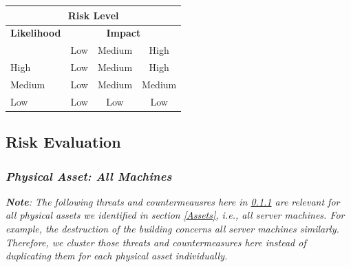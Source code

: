 \documentclass[english]{article}
\begin{document}
\vspace{5mm}

\begin{center}
\begin{tabular}{|l|c|c|c|}
\hline
\multicolumn{4}{|c|}{{\bf Risk Level}} \\
\hline
{{\bf Likelihood}} & \multicolumn{3}{c|}{{\bf Impact}} \\ %
     & Low & Medium & High \\  \hline
 High & Low & Medium & High  \\
\hline
 Medium & Low & Medium & Medium \\
\hline
 Low & Low & Low & Low \\
\hline
\end{tabular}
\end{center}

\subsection{Risk Evaluation}

\newcommand{\allmachinesNumber}{1}
\newcommand{\allmachinesconfidentialNumber}{2}
\newcommand{\firewallNumber}{3}
\newcommand{\webserverNumber}{4}
\newcommand{\adminserverNumber}{5}
\newcommand{\databaseNumber}{6}
\newcommand{\corecaNumber}{7}
\newcommand{\backupserverNumber}{8}
\newcommand{\softwareNumber}{9}
\newcommand{\informationNumber}{10}
\newcommand{\privatekeysNumber}{11}
\newcommand{\crlNumber}{12}
\newcommand{\sshprivatekeysNumber}{13}
\newcommand{\passwordsNumber}{14}
\newcommand{\systemadminsNumber}{15}
\newcommand{\caadminsNumber}{16}
\newcommand{\normalemployeeNumber}{17}
\newcommand{\trustofwhistleblowersNumber}{18}
\newcommand{\journalisticcredibilityNumber}{19}
\newcommand{\exclusivityNumber}{20}
\newcommand{\publicreachNumber}{21}

\subsubsection{{\it Physical Asset: \textbf{All Machines}}}
\label{All_Machines}

\textit{\textbf{Note}: The following threats and countermeausres here in \ref{All_Machines} are relevant for all physical assets we identified in section \ref{Assets}, i.e., all server machines. For example, the destruction of the building concerns all server machines similarly. Therefore, we cluster those threats and countermeasures here instead of duplicating them for each physical asset individually.}
\end{document}

